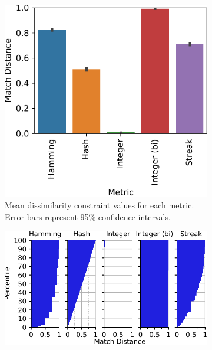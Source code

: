 \begin{figure}
\begin{center}
\begin{subfigure}[b]{\linewidth}
\begin{minipage}{0.6\linewidth}
\includegraphics[width=\linewidth]{img/sphere_reverse/bitweight=0dot5+seed=1+title=dimensionality_barplot+_data_hathash_hash=93f97a11cb443d35+_script_fullcat_hash=03ce1e318a24a109+ext=}
\end{minipage}
\begin{minipage}{0.35\linewidth}
\caption{
Mean dissimilarity constraint values for each metric.
Error bars represent 95\% confidence intervals.
}
\label{fig:sphere_reverse_distnplot}
\end{minipage}
\end{subfigure}
\begin{subfigure}[b]{\columnwidth}
\centering
\includegraphics[width=\columnwidth]{img/sphere_reverse/bitweight=0dot5+seed=1+title=dimensionality_distnplot+_data_hathash_hash=93f97a11cb443d35+_script_fullcat_hash=bea2a31376bf6bd0+ext=}

\end{subfigure}
\end{center}
\end{figure}
